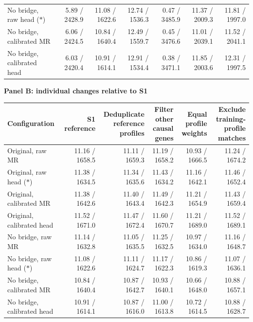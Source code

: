 \begin{landscape}
\begin{table}[p]
\begin{adjustbox}{max width=\linewidth}
\begin{tabular}{lrrrrrr}
No bridge, raw head ($\ast$) & 5.89 / 2428.9 & 11.08 / 1622.6 & 12.74 / 1536.3 & 0.47 / 3485.9 & 11.37 / 2009.3 & 11.81 / 1997.0 \\
No bridge, calibrated MR & 6.06 / 2424.5 & 10.84 / 1640.4 & 12.49 / 1559.7 & 0.45 / 3476.6 & 11.01 / 2039.1 & 11.52 / 2041.1 \\
No bridge, calibrated head & 6.03 / 2420.4 & 10.91 / 1614.1 & 12.91 / 1534.4 & 0.38 / 3471.1 & 11.85 / 2003.6 & 12.31 / 1997.5 \\
\bottomrule
\end{tabular}
\end{adjustbox}
\par\medskip
\textbf{Panel B: individual changes relative to S1}\par\smallskip
\begin{adjustbox}{max width=\linewidth}
\begin{tabular}{lrrrrr}
\toprule
Configuration & S1 reference & \shortstack{Deduplicate\\reference profiles} & \shortstack{Filter other\\causal genes} & \shortstack{Equal profile\\weights} & \shortstack{Exclude training-\\profile matches} \\
\midrule
Original, raw MR & 11.16 / 1658.5 & 11.11 / 1659.3 & 11.19 / 1658.2 & 10.93 / 1666.5 & 11.24 / 1674.2 \\
Original, raw head ($\ast$) & 11.38 / 1634.5 & 11.34 / 1635.6 & 11.43 / 1634.2 & 11.16 / 1642.1 & 11.46 / 1652.4 \\
Original, calibrated MR & 11.38 / 1642.6 & 11.40 / 1643.4 & 11.49 / 1642.3 & 11.21 / 1654.9 & 11.43 / 1659.4 \\
Original, calibrated head & 11.52 / 1671.0 & 11.47 / 1672.4 & 11.60 / 1670.7 & 11.21 / 1689.0 & 11.52 / 1689.1 \\
No bridge, raw MR & 11.14 / 1632.8 & 11.05 / 1635.5 & 11.25 / 1632.5 & 10.97 / 1634.0 & 11.16 / 1648.7 \\
No bridge, raw head ($\ast$) & 11.08 / 1622.6 & 11.11 / 1624.7 & 11.17 / 1622.3 & 10.86 / 1619.3 & 11.07 / 1636.1 \\
No bridge, calibrated MR & 10.84 / 1640.4 & 10.87 / 1642.7 & 10.93 / 1640.1 & 10.66 / 1648.0 & 10.88 / 1657.1 \\
No bridge, calibrated head & 10.91 / 1614.1 & 10.87 / 1616.0 & 11.00 / 1613.8 & 10.72 / 1614.5 & 10.88 / 1628.7 \\
\bottomrule
\end{tabular}
\end{adjustbox}
\end{table}
\clearpage
\end{landscape}
